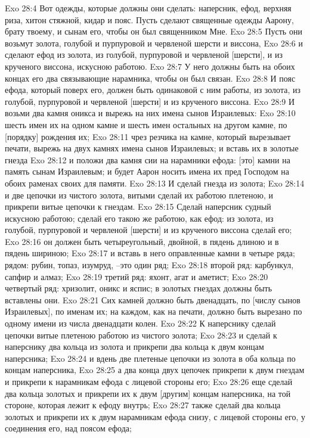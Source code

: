 Exo 28:4  Вот одежды, которые должны они сделать: наперсник, ефод, верхняя риза, хитон стяжной, кидар и пояс. Пусть сделают священные одежды Аарону, брату твоему, и сынам его, чтобы он был священником Мне.
Exo 28:5  Пусть они возьмут золота, голубой и пурпуровой и червленой шерсти и виссона,
Exo 28:6  и сделают ефод из золота, из голубой, пурпуровой и червленой [шерсти], и из крученого виссона, искусною работою.
Exo 28:7  У него должны быть на обоих концах его два связывающие нарамника, чтобы он был связан.
Exo 28:8  И пояс ефода, который поверх его, должен быть одинаковой с ним работы, из золота, из голубой, пурпуровой и червленой [шерсти] и из крученого виссона.
Exo 28:9  И возьми два камня оникса и вырежь на них имена сынов Израилевых:
Exo 28:10  шесть имен их на одном камне и шесть имен остальных на другом камне, по [порядку] рождения их;
Exo 28:11  чрез резчика на камне, который вырезывает печати, вырежь на двух камнях имена сынов Израилевых; и вставь их в золотые гнезда
Exo 28:12  и положи два камня сии на нарамники ефода: [это] камни на память сынам Израилевым; и будет Аарон носить имена их пред Господом на обоих раменах своих для памяти.
Exo 28:13  И сделай гнезда из золота;
Exo 28:14  и две цепочки из чистого золота, витыми сделай их работою плетеною, и прикрепи витые цепочки к гнездам.
Exo 28:15  Сделай наперсник судный искусною работою; сделай его такою же работою, как ефод: из золота, из голубой, пурпуровой и червленой [шерсти] и из крученого виссона сделай его;
Exo 28:16  он должен быть четыреугольный, двойной, в пядень длиною и в пядень шириною;
Exo 28:17  и вставь в него оправленные камни в четыре ряда; рядом: рубин, топаз, изумруд, --это один ряд;
Exo 28:18  второй ряд: карбункул, сапфир и алмаз;
Exo 28:19  третий ряд: яхонт, агат и аметист;
Exo 28:20  четвертый ряд: хризолит, оникс и яспис; в золотых гнездах должны быть вставлены они.
Exo 28:21  Сих камней должно быть двенадцать, по [числу сынов Израилевых], по именам их; на каждом, как на печати, должно быть вырезано по одному имени из числа двенадцати колен.
Exo 28:22  К наперснику сделай цепочки витые плетеною работою из чистого золота;
Exo 28:23  и сделай к наперснику два кольца из золота и прикрепи два кольца к двум концам наперсника;
Exo 28:24  и вдень две плетеные цепочки из золота в оба кольца по концам наперсника,
Exo 28:25  а два конца двух цепочек прикрепи к двум гнездам и прикрепи к нарамникам ефода с лицевой стороны его;
Exo 28:26  еще сделай два кольца золотых и прикрепи их к двум [другим] концам наперсника, на той стороне, которая лежит к ефоду внутрь;
Exo 28:27  также сделай два кольца золотых и прикрепи их к двум нарамникам ефода снизу, с лицевой стороны его, у соединения его, над поясом ефода;
